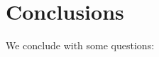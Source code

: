 \documentclass[reqno]{amsart}
\begin{document}
\begin{comment}
\begin{enumerate}
\item{objects given by sets,}
\item{vertical 1-morphisms given by functions,}
\item{horizontal 1-cells given by pairs:
\[
\begin{tikzpicture}[scale=1.5]
\node (D) at (-3,0) {$X$};
\node (E) at (-2,0) {$Z$};
\node (F) at (-1,0) {$Y$};
\node (A) at (0,0) {$P \in F(Z)$};
\path[->,font=\scriptsize,>=angle 90]
(D) edge node [above] {$i$} (E)
(F) edge node [above] {$o$} (E);
\end{tikzpicture}
\]
and}
\item{2-morphisms as maps of cospans in $\Set$:
\[
\begin{tikzpicture}[scale=1.5]
\node (E) at (3,0) {$X_1$};
\node (F) at (5,0) {$Y_1$};
\node (G) at (4,0) {$Z_1$};
\node (E') at (3,-1) {$X_2$};
\node (F') at (5,-1) {$Y_2$};
\node (G') at (4,-1) {$Z_2$};
\node (A) at (6,0) {$P_1 \in F(Z_1)$};
\node (B) at (6,-1) {$P_2 \in F(Z_2)$};
\path[->,font=\scriptsize,>=angle 90]
(F) edge node[above]{$o_1$} (G)
(E) edge node[left]{$f$} (E')
(F) edge node[right]{$g$} (F')
(G) edge node[left]{$h$} (G')
(E) edge node[above]{$i_1$} (G)
(E') edge node[above]{$i_2$} (G')
(F') edge node[above]{$o_2$} (G');
\end{tikzpicture}
\]
together with a morphism of Petri nets $\tau \maps F(h)(P_1) \to P_2$ in $F(Z_2)$.}
\end{enumerate}
Thus we have a symmetric monoidal double category $\lOpen(\Petri)$ of open Petri nets obtained from structured cospans and a symmetric monoidal double category $F\lCsp$ of open Petri nets obtain from decorated cospans, and of course, we have an equivalence $\lOpen(\Petri) \sim F\lCsp$ of symmetric monoidal double categories by \cref{thm:equiv}.
\end{comment}

\section{Conclusions}\label{sec:conclusions}

We conclude with some questions:
\end{document}
